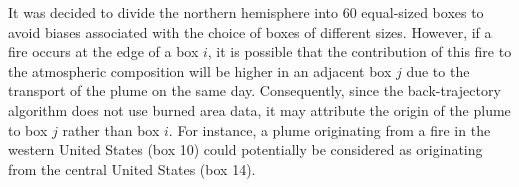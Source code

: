 \documentclass[acp, manuscript]{copernicus}
\begin{document}
It was decided to divide the northern hemisphere into 60 equal-sized boxes to avoid biases associated with the choice of boxes of different sizes. However, if a fire occurs at the edge of a box $i$, it is possible that the contribution of this fire to the atmospheric composition will be higher in an adjacent box $j$ due to the transport of the plume on the same day. Consequently, since the back-trajectory algorithm does not use burned area data, it may attribute the origin of the plume to box $j$ rather than box $i$. For instance, a plume originating from a fire in the western United States (box 10) could potentially be considered as originating from the central United States (box 14). %


\end{document}
